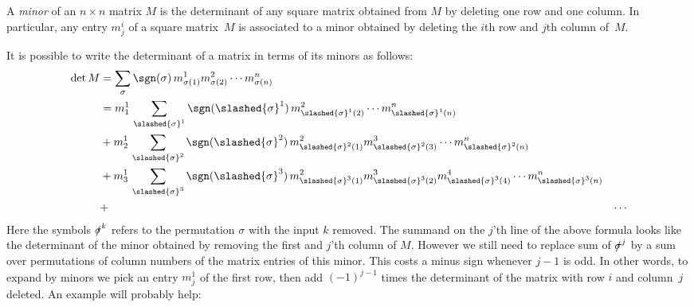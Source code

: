 A \emph{minor} of an $n\times n$ matrix $M$ is the determinant of any square matrix obtained from $M$ by deleting one row and one column.  In particular, any entry $m^i_j$ of a square matrix~$M$ is associated to a minor obtained by deleting the $i$th row and $j$th column of~$M$.

It is possible to write the determinant of a matrix in terms of  its minors as follows:
\begin{align*}
\det M &=\sum_{\sigma} \sgn (\sigma)\, m^1_{\sigma(1)}m^2_{\sigma(2)}\cdots m^n_{\sigma(n)} \\
&=m^1_1\, \sum_{\slashed{\sigma}^1} \sgn (\slashed{\sigma}^1)\, m^2_{\slashed{\sigma}^1(2)}\cdots m^n_{\slashed{\sigma}^1(n)} \\
& + m^1_2\, \sum_{\slashed{\sigma}^2} \sgn (\slashed{\sigma}^2)\, m^2_{\slashed{\sigma}^2(1)}
m^3_{\slashed{\sigma}^2(3)}\cdots m^n_{\slashed{\sigma}^2(n)} \\
& + m^1_3\,  \sum_{\slashed{\sigma}^3} \sgn (\slashed{\sigma}^3)\, m^2_{\slashed{\sigma}^3(1)}m^3_{\slashed{\sigma}^3(2)}m^4_{\slashed{\sigma}^3(4)}\cdots m^n_{\slashed{\sigma}^3(n)}\\ &+& \cdots
\end{align*}
Here the symbols $\slashed{\sigma}^k$ 
refers to the permutation $\sigma$ with the input $k$ removed.
The summand on  the $j$'th line of the above formula looks like the determinant of the minor obtained by removing the first  and $j$'th column of $M$. However we still need to  replace sum of $\slashed{\sigma}^j$ by a sum over permutations of  column numbers of the matrix entries of this minor. This costs a minus sign whenever $j-1$ is odd.
In other words, to expand by minors we pick an entry $m^1_j$ of the first row, then add $(-1)^{j-1}$ times the determinant of the matrix with row $i$ and column~$j$ deleted. An example will probably help:

